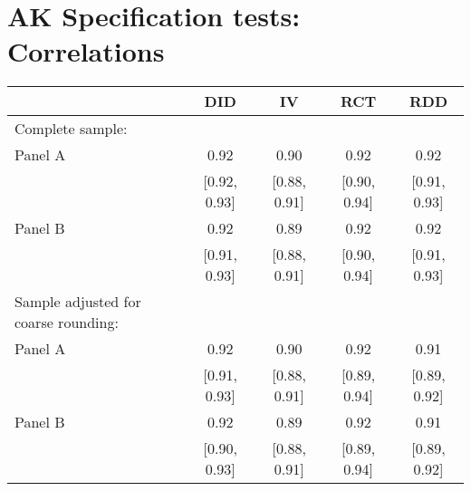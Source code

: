 \documentclass[
]{article}
\begin{document}
\hypertarget{ak-specification-tests-correlations}{%
\section{AK Specification tests:
Correlations}\label{ak-specification-tests-correlations}}

\def\sym#1{\ifmmode^{#1}\else\(^{#1}\)\fi}
\begin{tabular}{l*{4}{c}}
\hline\hline
& \multicolumn{1}{c}{DID} &  \multicolumn{1}{c}{IV} &  \multicolumn{1}{c}{RCT} &  \multicolumn{1}{c}{RDD}\\

\hline
\hline

Complete sample:\\

Panel A & 0.92 &  0.90 &  0.92 &  0.92\\
& [0.92, 0.93] &  [0.88, 0.91] &  [0.90, 0.94] &  [0.91, 0.93]\\

Panel B & 0.92 &  0.89 &  0.92 &  0.92\\
& [0.91, 0.93] &  [0.88, 0.91] &  [0.90, 0.94] &  [0.91, 0.93]\\

Sample adjusted for coarse rounding:\\

Panel A & 0.92 &  0.90 &  0.92 &  0.91\\
& [0.91, 0.93] &  [0.88, 0.91] &  [0.89, 0.94] &  [0.89, 0.92]\\

Panel B & 0.92 &  0.89 &  0.92 &  0.91\\
& [0.90, 0.93] &  [0.88, 0.91] &  [0.89, 0.94] &  [0.89, 0.92]\\

\hline\hline
\end{tabular}
\end{document}
